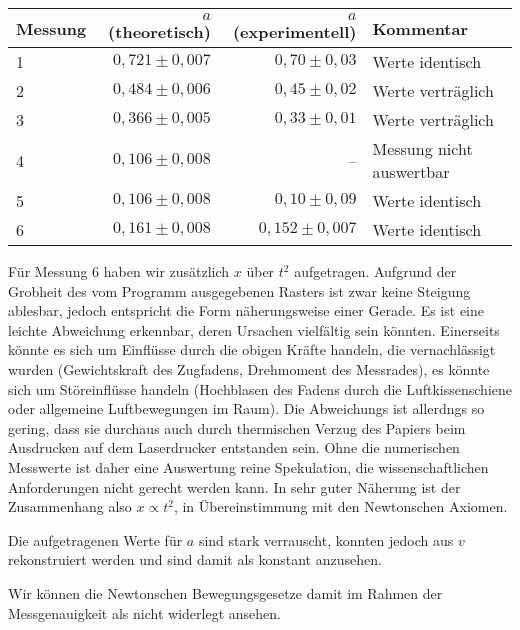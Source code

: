 \documentclass[a4paper,german,12pt,smallheadings]{scrartcl}
\begin{document}
\vspace{0.7cm}


\begin{tabular}{l|r|r|l}
  Messung & $a$ (theoretisch) & $a$ (experimentell) & Kommentar \\
  \hline
  1 & $0{,}721\pm0{,}007$ & $0{,}70\pm0{,}03$ & Werte identisch \\
  2 & $0{,}484\pm0{,}006$ & $0{,}45\pm0{,}02$ & Werte verträglich \\
  3 & $0{,}366\pm0{,}005$ & $0{,}33\pm0{,}01$ & Werte verträglich \\
  4 & $0{,}106\pm0{,}008$ & -- & Messung nicht auswertbar \\
  5 & $0{,}106\pm0{,}008$ & $0{,}10\pm0{,}09$ & Werte identisch \\
  6 & $0{,}161\pm0{,}008$ & $0{,}152\pm0{,}007$ & Werte identisch
\end{tabular}

\vspace{0.7cm}

Für Messung 6 haben wir zusätzlich $x$ über $t^2$ aufgetragen. Aufgrund der
Grobheit des vom Programm ausgegebenen Rasters ist zwar keine Steigung
ablesbar, jedoch entspricht die Form näherungsweise einer Gerade. Es ist eine
leichte Abweichung erkennbar,
deren Ursachen vielfältig sein könnten. Einerseits könnte es sich um Einflüsse
durch die obigen Kräfte handeln, die vernachlässigt wurden (Gewichtskraft des
Zugfadens, Drehmoment des Messrades), es könnte sich um Störeinflüsse handeln
(Hochblasen des Fadens durch die Luftkissenschiene oder allgemeine
Luftbewegungen im Raum). Die Abweichungs ist allerdngs so gering, dass sie
durchaus auch durch thermischen Verzug des Papiers beim Ausdrucken auf dem
Laserdrucker entstanden sein. Ohne die numerischen Messwerte ist daher eine
Auswertung reine Spekulation, die wissenschaftlichen Anforderungen nicht
gerecht werden kann. In sehr guter Näherung ist der Zusammenhang also $x \propto
t^2$, in Übereinstimmung mit den Newtonschen Axiomen.

Die aufgetragenen Werte für $a$ sind stark verrauscht, konnten jedoch aus $v$
rekonstruiert werden und sind damit als konstant anzusehen.

Wir können die Newtonschen Bewegungsgesetze damit im Rahmen der Messgenauigkeit
als nicht widerlegt ansehen.
\end{document}
